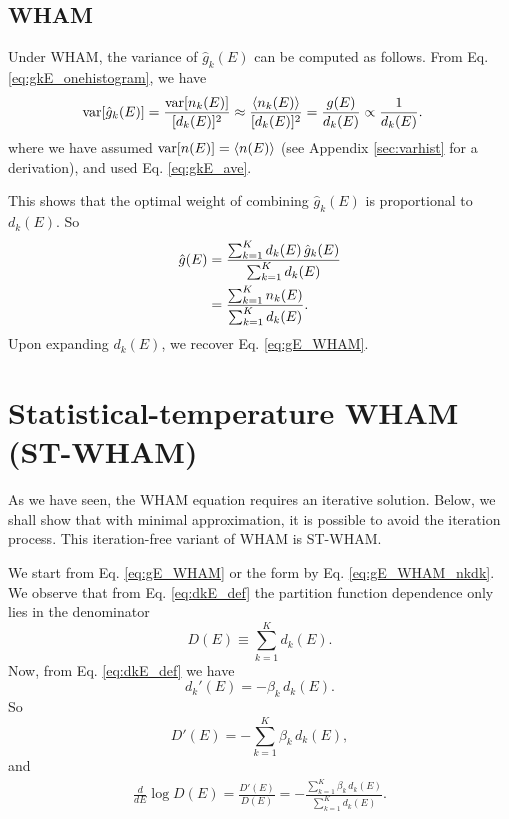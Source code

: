\documentclass[aip,jcp,preprint,superscriptaddress]{revtex4-1}
\begin{document}
\subsection{WHAM}



Under WHAM,
the variance of $\hat g_k(E)$ can be computed as follows.
%
From Eq. \eqref{eq:gkE_onehistogram},
we have
%
\begin{align*}
\mathrm{var}[ \hat g_k(E) ]
&=
\frac{ \mathrm{var}[ n_k(E) ] }
{ [ d_k(E) ]^2 }
\approx
\frac{ \langle n_k(E) \rangle }
{ [ d_k(E) ]^2 }
=
\frac{ g(E) } { d_k(E) }
\propto
\frac{ 1 } { d_k(E) }.
\end{align*}
where we have assumed
$\mathrm{var}[ n(E) ] = \langle n(E) \rangle$
(see Appendix \ref{sec:varhist}
for a derivation),
and used Eq. \eqref{eq:gkE_ave}.



This shows that the optimal weight
of combining $\hat g_k(E)$ is proportional to $d_k(E)$.
%
So
\begin{align}
\hat g(E)
&=
\frac{ \sum_{k = 1}^K d_k(E) \, \hat g_k(E) }
     { \sum_{k = 1}^K d_k(E) }
\notag \\
&=
\frac{ \sum_{k = 1}^K n_k(E) }
     { \sum_{k = 1}^K d_k(E) }.
\label{eq:gE_WHAM_nkdk}
\end{align}
%
Upon expanding $d_k(E)$,
we recover Eq. \eqref{eq:gE_WHAM}.



\section{\label{sec:ST-WHAM}
Statistical-temperature WHAM (ST-WHAM)}




As we have seen,
the WHAM equation requires an iterative solution.
%
Below, we shall show that
with minimal approximation,
it is possible to avoid the iteration process.
%
This iteration-free variant of WHAM
is ST-WHAM\cite{fenwick2008, kim2011}.



We start from Eq. \eqref{eq:gE_WHAM}
or the form by Eq. \eqref{eq:gE_WHAM_nkdk}.
%
We observe that from Eq. \eqref{eq:dkE_def}
the partition function
dependence only lies in the denominator
\[
D(E)
\equiv
\sum_{k = 1}^K d_k(E).
\]
Now, from Eq. \eqref{eq:dkE_def} we have
\[
d_k'(E)
= -\beta_k \, d_k(E).
\]
So
\[
D'(E)
= -\sum_{k = 1}^K \beta_k \, d_k(E),
\]
and
\begin{align}
\frac{d}{dE} \log D(E)
=
\frac{ D'(E) } { D(E) }
=
-\frac{ \sum_{k = 1}^K \beta_k \, d_k(E) }
      { \sum_{k = 1}^K d_k(E) }.
\label{eq:dlogD_step1}
\end{align}
\end{document}
